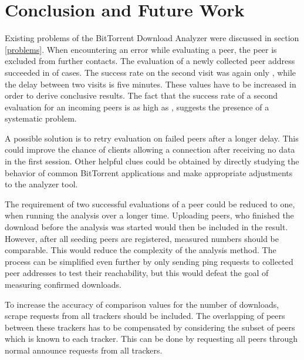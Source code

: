 \documentclass[10pt, a4paper, twoside=false, headsepline]{scrbook}
\renewcommand{\_}{\origunderscore\allowbreak}
\begin{document}
\chapter{Conclusion and Future Work}
\label{conc}
Existing problems of the BitTorrent Download Analyzer were discussed in section \ref{problems}. When encountering an error while evaluating a peer, the peer is excluded from further contacts. The evaluation of a newly collected peer address succeeded in  of cases. The success rate on the second visit was again only , while the delay between two visits is five minutes. These values have to be increased in order to derive conclusive results. The fact that the success rate of a second evaluation for an incoming peers is as high as , suggests the presence of a systematic problem.

A possible solution is to retry evaluation on failed peers after a longer delay. This could improve the chance of clients allowing a connection after receiving no data in the first session. Other helpful clues could be obtained by directly studying the behavior of common BitTorrent applications and make appropriate adjustments to the analyzer tool.

The requirement of two successful evaluations of a peer could be reduced to one, when running the analysis over a longer time. Uploading peers, who finished the download before the analysis was started would then be included in the result. However, after all seeding peers are registered, measured numbers should be comparable. This would reduce the complexity of the analysis method.
The process can be simplified even further by only sending ping requests to collected peer addresses to test their reachability, but this would defeat the goal of measuring confirmed downloads.

To increase the accuracy of comparison values for the number of downloads, scrape requests from all trackers should be included. The overlapping of peers between these trackers has to be compensated by considering the subset of peers which is known to each tracker. This can be done by requesting all peers through normal announce requests from all trackers.

\ihead{}
\setcounter{biburllcpenalty}{7000}
\setcounter{biburlucpenalty}{8000}
\printbibheading[heading=bibintoc]
\begingroup
\setlength{}
\printbibliography[heading=subbibintoc, title={Literature}, keyword=science]
\printbibliography[heading=subbibintoc, title={Software}, keyword=software]
\printbibliography[heading=subbibintoc, title={Online}, keyword=online]
\endgroup
\printbibliography[heading=subbibintoc, title={Standards}, keyword=standard]
\end{document}
